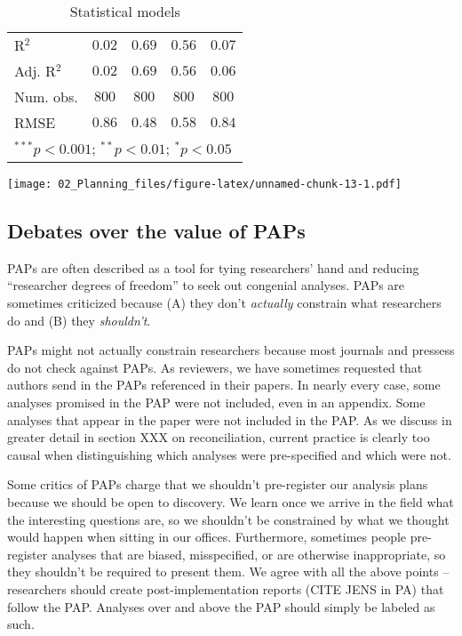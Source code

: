 \documentclass[
]{article}
\begin{document}
\begin{table}
\begin{center}
\begin{tabular}{l c c c c}
\hline
R$^2$                            & $0.02$       & $0.69$        & $0.56$       & $0.07$       \\
Adj. R$^2$                       & $0.02$       & $0.69$        & $0.56$       & $0.06$       \\
Num. obs.                        & $800$        & $800$         & $800$        & $800$        \\
RMSE                             & $0.86$       & $0.48$        & $0.58$       & $0.84$       \\
\hline
\multicolumn{5}{l}{\scriptsize{$^{***}p<0.001$; $^{**}p<0.01$; $^{*}p<0.05$}}
\end{tabular}
\caption{Statistical models}
\label{table:coefficients}
\end{center}
\end{table}

\texttt{[image: 02\_Planning\_files/figure-latex/unnamed-chunk-13-1.pdf]}

\hypertarget{debates-over-the-value-of-paps}{%
\subsection{Debates over the value of
PAPs}\label{debates-over-the-value-of-paps}}

PAPs are often described as a tool for tying researchers' hand and
reducing ``researcher degrees of freedom'' to seek out congenial
analyses. PAPs are sometimes criticized because (A) they don't
\emph{actually} constrain what researchers do and (B) they
\emph{shouldn't}.

PAPs might not actually constrain researchers because most journals and
pressess do not check against PAPs. As reviewers, we have sometimes
requested that authors send in the PAPs referenced in their papers. In
nearly every case, some analyses promised in the PAP were not included,
even in an appendix. Some analyses that appear in the paper were not
included in the PAP. As we discuss in greater detail in section XXX on
reconciliation, current practice is clearly too causal when
distinguishing which analyses were pre-specified and which were not.

Some critics of PAPs charge that we shouldn't pre-register our analysis
plans because we should be open to discovery. We learn once we arrive in
the field what the interesting questions are, so we shouldn't be
constrained by what we thought would happen when sitting in our offices.
Furthermore, sometimes people pre-register analyses that are biased,
misspecified, or are otherwise inappropriate, so they shouldn't be
required to present them. We agree with all the above points --
researchers should create post-implementation reports (CITE JENS in PA)
that follow the PAP. Analyses over and above the PAP should simply be
labeled as such.
\end{document}

